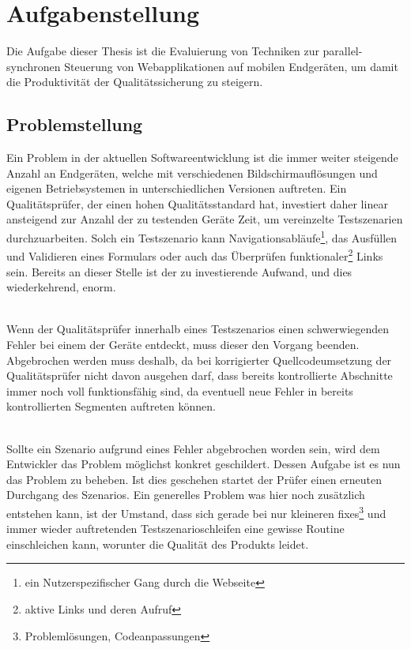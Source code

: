 \chapter{Aufgabenstellung}

Die Aufgabe dieser Thesis ist die Evaluierung von Techniken zur parallel-synchronen Steuerung von Webapplikationen auf mobilen Endgeräten, um damit die Produktivität der Qualitätssicherung zu steigern.
	\section{Problemstellung}
	Ein Problem in der aktuellen Softwareentwicklung ist die immer weiter steigende Anzahl an Endgeräten, welche mit 			verschiedenen Bildschirmauflösungen und eigenen Betriebsystemen in unterschiedlichen Versionen auftreten. Ein 				Qualitätsprüfer, der einen hohen Qualitätsstandard hat, investiert daher linear ansteigend zur Anzahl der zu testenden Geräte Zeit, um vereinzelte Testszenarien durchzuarbeiten. Solch ein Testszenario kann Navigationsabläufe\footnote{ein 		Nutzerspezifischer Gang durch die Webseite}, das Ausfüllen und Validieren eines Formulars oder auch das Überprüfen 			funktionaler\footnote{aktive Links und deren Aufruf} Links sein. Bereits an dieser Stelle ist der zu investierende Aufwand, und dies 		wiederkehrend, enorm.
	
	\\Wenn der Qualitätsprüfer innerhalb eines Testszenarios einen schwerwiegenden Fehler bei einem der Geräte entdeckt, muss 		dieser den Vorgang beenden. Abgebrochen werden muss deshalb, da bei korrigierter Quellcodeumsetzung der Qualitätsprüfer nicht 	davon ausgehen darf, dass bereits kontrollierte Abschnitte immer noch voll funktionsfähig sind, da eventuell neue Fehler in bereits kontrollierten Segmenten auftreten können.
	
	\\Sollte ein Szenario aufgrund eines Fehler abgebrochen worden sein, wird dem Entwickler das Problem möglichst konkret 		geschildert. Dessen Aufgabe ist es nun das Problem zu beheben. Ist dies geschehen startet der Prüfer einen erneuten 			Durchgang des Szenarios. Ein generelles Problem was hier noch zusätzlich entstehen kann, ist der Umstand, dass sich gerade 		bei nur kleineren fixes\footnote{Problemlösungen, Codeanpassungen} und immer wieder auftretenden Testszenarioschleifen 		eine gewisse Routine einschleichen kann, worunter die Qualität des Produkts leidet.

